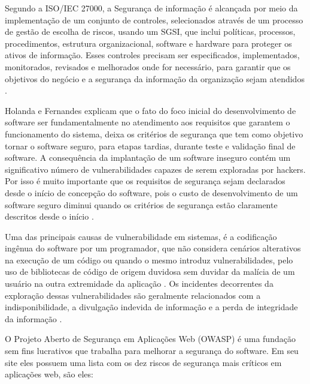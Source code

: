 Segundo a ISO/IEC 27000, a Segurança de informação é alcançada por meio da implementação de um conjunto de controles, selecionados através de um processo de gestão de escolha de riscos, usando um SGSI, que inclui políticas, processos, procedimentos, estrutura organizacional, software e hardware para proteger os ativos de informação. Esses controles precisam ser especificados, implementados, monitorados, revisados e melhorados onde for necessário, para garantir que  os objetivos do negócio e a segurança da informação da organização sejam atendidos \cite{ISO27000}.



Holanda e Fernandes \cite{holanda2009segurancca} explicam que o fato do foco inicial do desenvolvimento de software ser fundamentalmente no atendimento aos requisitos que garantem o funcionamento do sistema, deixa os critérios de segurança que tem como objetivo tornar o software seguro, para etapas tardias, durante teste e validação final de software. A consequência da implantação de um software inseguro contém um significativo número de vulnerabilidades capazes de serem exploradas por hackers. Por isso é muito importante que os requisitos de segurança sejam declarados desde o início de concepção do software, pois o custo de desenvolvimento de um software seguro diminui quando os critérios de segurança estão claramente descritos desde o início \cite{holanda2009segurancca}.

Uma das principais causas de vulnerabilidade em sistemas, é a codificação ingênua do software por um programador, que não considera cenários alterativos na execução de um código ou quando o mesmo introduz vulnerabilidades, pelo uso de bibliotecas de código de origem duvidosa sem duvidar da malícia de um usuário na outra extremidade da aplicação \cite{holanda2009segurancca}. Os incidentes decorrentes da exploração dessas vulnerabilidades são geralmente relacionados com a indisponibilidade, a divulgação indevida de informação e a perda de integridade da informação \cite{holanda2009segurancca}.

O Projeto Aberto de Segurança em Aplicações Web (OWASP) é uma fundação sem fins lucrativos que trabalha para melhorar a segurança do software. Em seu site eles possuem uma lista \cite{owasp} com os dez riscos de segurança mais críticos em aplicações web, são eles:

